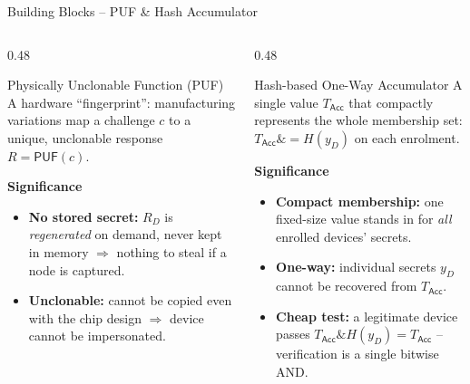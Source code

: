 \begin{frame}{Building Blocks -- PUF \& Hash Accumulator}
    \vspace{0.4cm}
    \begin{columns}[T,onlytextwidth]
        \begin{column}{0.48\textwidth}
            \begin{block}{Physically Unclonable Function (PUF)}
                \footnotesize
                A hardware ``fingerprint'': manufacturing variations map a
                challenge $c$ to a unique, unclonable response $R=\mathsf{PUF}(c)$.
            \end{block}
            \vspace{0.4cm}
            \textbf{Significance}
            \begin{itemize}\footnotesize
                \item \textbf{No stored secret:} $R_D$ is \emph{regenerated} on demand,
                never kept in memory $\Rightarrow$ nothing to steal if a node is captured.
                \item \textbf{Unclonable:} cannot be copied even with the chip design
                $\Rightarrow$ device cannot be impersonated.
            \end{itemize}
        \end{column}
        \hfill
        \begin{column}{0.48\textwidth}
            \begin{block}{Hash-based One-Way Accumulator}
                \footnotesize
                A single value $T_{\mathsf{Acc}}$ that compactly represents the whole
                membership set: $T_{\mathsf{Acc}} \mathrel{\&}{=} H(y_D)$ on each enrolment.
            \end{block}
            \vspace{0.4cm}
            \textbf{Significance}
            \begin{itemize}\footnotesize
                \item \textbf{Compact membership:} one fixed-size value stands in for
                \emph{all} enrolled devices' secrets.
                \item \textbf{One-way:} individual secrets $y_D$ cannot be recovered
                from $T_{\mathsf{Acc}}$.
                \item \textbf{Cheap test:} a legitimate device passes
                $T_{\mathsf{Acc}} \mathrel{\&} H(y_D) = T_{\mathsf{Acc}}$ -- verification
                is a single bitwise AND.
            \end{itemize}
        \end{column}
    \end{columns}
\end{frame}

